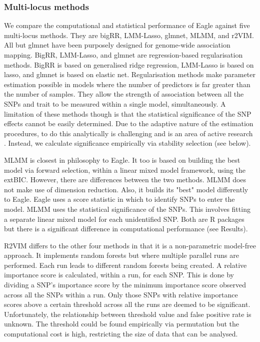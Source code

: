 \documentclass{nature}
\begin{document}
\subsubsection*{Multi-locus methods}

We compare the computational and statistical performance of Eagle against five multi-locus methods. They are bigRR, LMM-Lasso, glmnet, 
MLMM, and r2VIM.  All but glmnet have been purposely designed for genome-wide association mapping. 
BigRR, LMM-Lasso, and glmnet are regression-based regularisation 
methods. BigRR is based on generalised ridge regression, LMM-Lasso is based on lasso, and glmnet is based on elastic net. 
Regularisation methods make parameter estimation possible in models  where the number of predictors is far greater than the number of samples. 
They allow the strength of association between all the SNPs and trait to be measured within a single model, simultaneously. 
A limitation of these methods though is that the statistical significance of the SNP effects cannot be easily determined. 
 Due to the adaptive nature of the estimation procedures, to do this 
analytically is challenging and is an area of active research \cite{lockhart2014significance}. Instead, we calculate significance empirically via 
stability selection (see below). 

MLMM is closest in philosophy to Eagle. It too is based on building the best model via forward selection, 
within  a linear mixed model framework, using the 
extBIC. However, there are differences between the two methods.  MLMM does not make use of dimension reduction. Also, it builds its "best" 
model differently to Eagle.  Eagle uses a score statistic in which to identify SNPs to enter the model.
MLMM uses the statistical significance of the SNPs. This involves fitting a separate linear mixed model for each unidentified SNP. 
Both are R packages but there is a significant difference in computational performance (see Results). 
  
R2VIM differs to the other four methods in that it is a non-parametric model-free approach. It implements  
random forests but where multiple parallel runs are performed. Each run leads to 
different random forests being created.  A relative importance score is calculated, within a run,  for each SNP. This is done by dividing a SNP's 
importance score by the minimum importance score observed across all the SNPs within a run. 
Only those SNPs with relative importance scores above a certain threshold across all the runs are deemed to be significant. 
Unfortunately, the relationship between threshold value and false positive rate is unknown. The threshold could be found empirically via permutation 
but the computational cost is high, restricting the size of data that can be analysed. 
\end{document}
